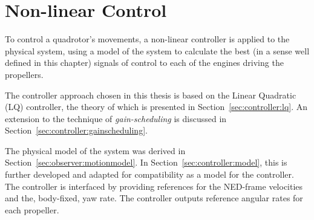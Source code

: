 \chapter{Non-linear Control}
\label{cha:controller}
    To control a quadrotor's movements, a non-linear controller is applied to the
    physical system, using a model of the system to calculate the best
    (in a sense well defined in this chapter) signals of control to each
    of the engines driving the propellers.

    The controller approach chosen in this thesis is based on the Linear Quadratic (LQ)
    controller, the theory of which is presented in Section~\ref{sec:controller:lq}.
    An extension to the technique of \textit{gain-scheduling} is discussed
    in Section~\ref{sec:controller:gainscheduling}.

    The physical model of the system was derived in Section~\ref{sec:observer:motionmodel}.
    In Section~\ref{sec:controller:model}, this is further developed
    and adapted for compatibility as a model for the controller.
    The controller is interfaced by providing references
    for the NED-frame velocities and the, body-fixed, yaw rate.
    The controller outputs reference angular rates for each propeller.

    
    
    
